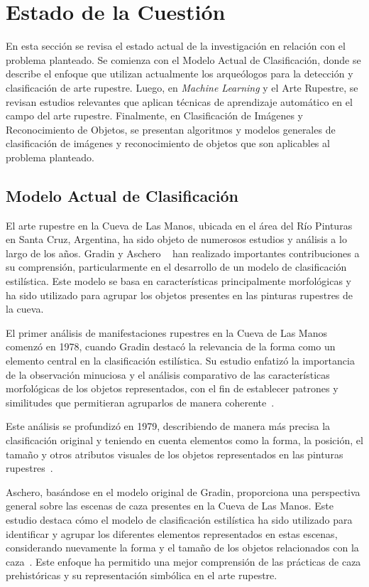 \newpage
\section{Estado de la Cuestión}

En esta sección se revisa el estado actual de la investigación en relación con el problema planteado. Se comienza con el Modelo Actual de Clasificación, donde se describe el enfoque que utilizan actualmente los arqueólogos para la detección y clasificación de arte rupestre. Luego, en \textit{Machine Learning} y el Arte Rupestre, se revisan estudios relevantes que aplican técnicas de aprendizaje automático en el campo del arte rupestre. Finalmente, en Clasificación de Imágenes y Reconocimiento de Objetos, se presentan algoritmos y modelos generales de clasificación de imágenes y reconocimiento de objetos que son aplicables al problema planteado.

\subsection{Modelo Actual de Clasificación}

El arte rupestre en la Cueva de Las Manos, ubicada en el área del Río Pinturas en Santa Cruz, Argentina, ha sido objeto de numerosos estudios y análisis a lo largo de los años. Gradin y Aschero ~\cite{aschero2010} han realizado importantes contribuciones a su comprensión, particularmente en el desarrollo de un modelo de clasificación estilística. Este modelo se basa en características principalmente morfológicas y ha sido utilizado para agrupar los objetos presentes en las pinturas rupestres de la cueva.

El primer análisis de manifestaciones rupestres en la Cueva de Las Manos comenzó en 1978, cuando Gradin destacó la relevancia de la forma como un elemento central en la clasificación estilística. Su estudio enfatizó la importancia de la observación minuciosa y el análisis comparativo de las características morfológicas de los objetos representados, con el fin de establecer patrones y similitudes que permitieran agruparlos de manera coherente~\cite{gradin1978}.

Este análisis se profundizó en 1979, describiendo de manera más precisa la clasificación original y teniendo en cuenta elementos como la forma, la posición, el tamaño y otros atributos visuales de los objetos representados en las pinturas rupestres~\cite{gradin1979}.

Aschero, basándose en el modelo original de Gradin, proporciona una perspectiva general sobre las escenas de caza presentes en la Cueva de Las Manos. Este estudio destaca cómo el modelo de clasificación estilística ha sido utilizado para identificar y agrupar los diferentes elementos representados en estas escenas, considerando nuevamente la forma y el tamaño de los objetos relacionados con la caza~\cite{aschero2018}. Este enfoque ha permitido una mejor comprensión de las prácticas de caza prehistóricas y su representación simbólica en el arte rupestre.

